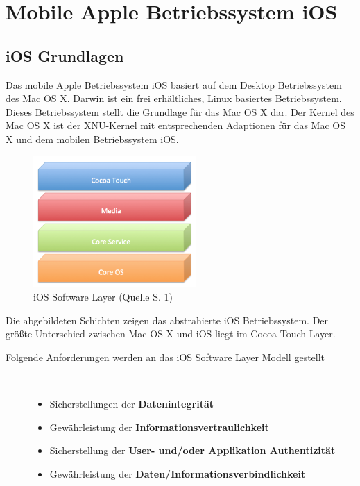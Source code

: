 %
%
% 
% 
% 
\chapter{Mobile Apple Betriebssystem iOS}
\label{ch:iOS}
\section{iOS Grundlagen}
\label{sec:iOSGrundlage}

Das mobile Apple Betriebssystem iOS basiert auf dem Desktop Betriebssystem des Mac OS X. Darwin ist ein frei erhältliches, Linux basiertes Betriebssystem. Dieses Betriebssystem stellt die Grundlage für das Mac OS X dar. Der Kernel des Mac OS X ist der XNU-Kernel mit entsprechenden Adaptionen für das Mac OS X und dem mobilen Betriebssystem iOS.\par 
\begin{figure}[hp!]
        \centering
                \includegraphics[height=5cm]{Bilder/Chapter3_SystemArchitektur}
        \caption{iOS Software Layer (Quelle \cite{iOSSec[6]} S. 1)}
        	\label{fig:iOS Software Layer}
\end{figure}
Die abgebildeten Schichten zeigen das abstrahierte iOS Betriebssystem. Der größte Unterschied zwischen Mac OS X und iOS liegt im Cocoa Touch Layer.
\begin{description}
\item[Folgende Anforderungen werden an das iOS Software Layer Modell gestellt]~\par
	\begin{itemize}
		\item Sicherstellungen der \textbf{Datenintegrität}
		\item Gewährleistung der \textbf{Informationsvertraulichkeit}
		\item Sicherstellung der \textbf{User- und/oder Applikation Authentizität}
		\item Gewährleistung der \textbf{Daten/Informationsverbindlichkeit}
	\end{itemize}
\end{description}
